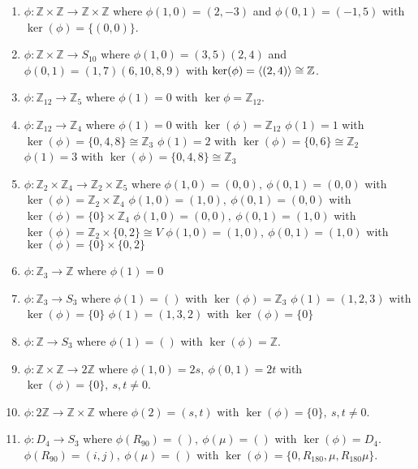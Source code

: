 \begin{enumerate}
	\item $\phi : \mathbb{Z} \times \mathbb{Z} \to \mathbb{Z} \times \mathbb{Z}$ where $\phi(1,0)=(2,-3)$ and $\phi(0,1) = (-1,5)$ with $\ker(\phi) = \{ (0,0) \}$.
	\item $\phi : \mathbb{Z} \times \mathbb{Z} \to S_{10}$ where $\phi(1,0) = (3,5)(2,4)$ and $\phi(0,1) = (1,7)(6,10,8,9)$ with $\ker(\phi)= \left\langle (2,4) \right\rangle \cong \mathbb{Z}$.
	\item $\phi : \mathbb{Z}_{12} \to \mathbb{Z}_5$ where $\phi(1)=0$ with $\ker{\phi}=\mathbb{Z}_{12}$.
	\item $\phi : \mathbb{Z}_{12} \to \mathbb{Z}_4$ where
		\subitem $\phi(1)=0$ with $\ker(\phi)=\mathbb{Z}_{12}$
		\subitem $\phi(1)=1$ with $\ker(\phi)=\{0,4,8\} \cong \mathbb{Z}_3$
		\subitem $\phi(1)=2$ with $\ker(\phi)=\{ 0,6 \} \cong \mathbb{Z}_2$
		\subitem $\phi(1)=3$ with $\ker(\phi)=\{ 0,4,8\} \cong \mathbb{Z}_3$
	\item $\phi : \mathbb{Z}_2 \times \mathbb{Z}_4 \to \mathbb{Z}_2 \times \mathbb{Z}_5$ where
		\subitem $\phi(1,0) = (0,0) ,\ \phi(0,1) = (0,0)$ with $\ker(\phi) = \mathbb{Z}_2 \times \mathbb{Z}_4$
		\subitem $\phi(1,0) = (1,0) ,\ \phi(0,1) = (0,0)$ with $\ker(\phi) = \{ 0 \} \times \mathbb{Z}_4$
		\subitem $\phi(1,0) = (0,0) ,\ \phi(0,1) = (1,0)$ with $\ker(\phi) = \mathbb{Z}_2 \times \{ 0,2 \} \cong V$
		\subitem $\phi(1,0) = (1,0) ,\ \phi(0,1) = (1,0)$ with $\ker(\phi) = \{ 0 \} \times \{ 0,2 \}$
	\item $\phi : \mathbb{Z}_3 \to \mathbb{Z}$ where $\phi(1) = 0$
	\item $\phi : \mathbb{Z}_3 \to S_3$ where 
		\subitem $\phi(1) = ()$ with $\ker(\phi) = \mathbb{Z}_3$
		\subitem $\phi(1) = (1,2,3)$ with $\ker(\phi) = \{ 0 \}$
		\subitem $\phi(1) = (1,3,2)$ with $\ker(\phi) = \{ 0 \}$
	\item $\phi : \mathbb{Z} \to S_3$ where $\phi(1) = ()$ with $\ker(\phi) = \mathbb{Z}$.
	\item $\phi : \mathbb{Z} \times \mathbb{Z} \to 2\mathbb{Z}$ where $\phi(1,0) = 2s ,\ \phi(0,1)= 2t $ with $\ker(\phi) = \{ 0 \},\ s,t \ne 0 $.
	\item $\phi : 2\mathbb{Z} \to \mathbb{Z} \times \mathbb{Z}$ where $\phi(2) = (s,t)$ with $\ker(\phi)= \{ 0 \},\ s,t \ne 0$.
	\item $\phi : D_4 \to S_3$ where 
		\subitem $\phi(R_{90}) =(),\ \phi(\mu) =()$ with $\ker(\phi) = D_4$.
		\subitem $\phi(R_{90}) =(i,j),\ \phi(\mu) =()$ with $\ker(\phi) = \{ 0,R_{180},\mu, R_{180}\mu \}$.

\end{enumerate}
